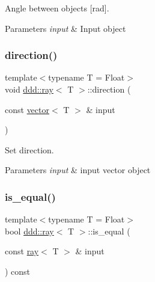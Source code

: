 Angle between objects \mbox{[}rad\mbox{]}. 


\begin{DoxyParams}{Parameters}
{\em input} & Input object \\
\hline
\end{DoxyParams}
\mbox{\label{classddd_1_1ray_a52a945e00576b41d9e42a221a26aee14}} 
\subsubsection{\texorpdfstring{direction()}{direction()}}
{\footnotesize\ttfamily template$<$typename T = Float$>$ \\
void \hyperlink{classddd_1_1ray}{ddd\+::ray}$<$ T $>$\+::direction (\begin{DoxyParamCaption}\item[{const \hyperlink{classddd_1_1vector}{vector}$<$ T $>$ \&}]{input }\end{DoxyParamCaption})\hspace{0.3cm}{\ttfamily [inline]}}



Set direction. 


\begin{DoxyParams}{Parameters}
{\em input} & input vector object \\
\hline
\end{DoxyParams}
\mbox{\label{classddd_1_1ray_a9f556671f1aafce7838d9cd716e1bd72}} 
\subsubsection{\texorpdfstring{is\+\_\+equal()}{is\_equal()}}
{\footnotesize\ttfamily template$<$typename T = Float$>$ \\
bool \hyperlink{classddd_1_1ray}{ddd\+::ray}$<$ T $>$\+::is\+\_\+equal (\begin{DoxyParamCaption}\item[{const \hyperlink{classddd_1_1ray}{ray}$<$ T $>$ \&}]{input }\end{DoxyParamCaption}) const\hspace{0.3cm}{\ttfamily [inline]}}



